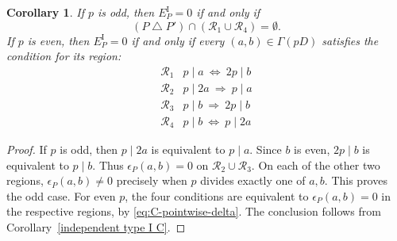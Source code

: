 \documentclass[11pt,a4paper]{amsart}
\theoremstyle{plain}
\newtheorem{cor}[theorem]{Corollary}
\numberwithin{equation}{section}
\newenvironment{pf}{\begin{proof}}{\end{proof}}
\begin{document}
\begin{cor}
\label{lem:C-pointwise-coefficients}
If \(p\) is odd, then \(E_P^{\mathrm I}=0\) if and only if
\[
 (P\mathbin\triangle P')\cap
 (\mathcal R_1\cup\mathcal R_4)=\emptyset.
\]
If \(p\) is even, then \(E_P^{\mathrm I}=0\) if and only if every
\((a,b)\in\Gamma(pD)\) satisfies the condition for its region:
\[
\begin{array}{c|c}
\mathcal R_1&p\mid a\ \Longleftrightarrow\ 2p\mid b\\
\mathcal R_2&p\mid2a\ \Longrightarrow\ p\mid a\\
\mathcal R_3&p\mid b\ \Longrightarrow\ 2p\mid b\\
\mathcal R_4&p\mid b\ \Longleftrightarrow\ p\mid2a
\end{array}
\]
\end{cor}
\begin{pf}
If \(p\) is odd, then \(p\mid2a\) is equivalent to \(p\mid a\).
Since \(b\) is even, \(2p\mid b\) is equivalent to \(p\mid b\).
Thus \(\epsilon_P(a,b)=0\) on \(\mathcal R_2\cup\mathcal R_3\).
On each of the other two regions, \(\epsilon_P(a,b)\ne0\) precisely
when \(p\) divides exactly one of \(a,b\). This proves the odd case.
For even \(p\), the four conditions are equivalent to
\(\epsilon_P(a,b)=0\) in the respective regions, by
\eqref{eq:C-pointwise-delta}. The conclusion follows from
Corollary~\ref{independent type I C}.
\end{pf}
\end{document}
